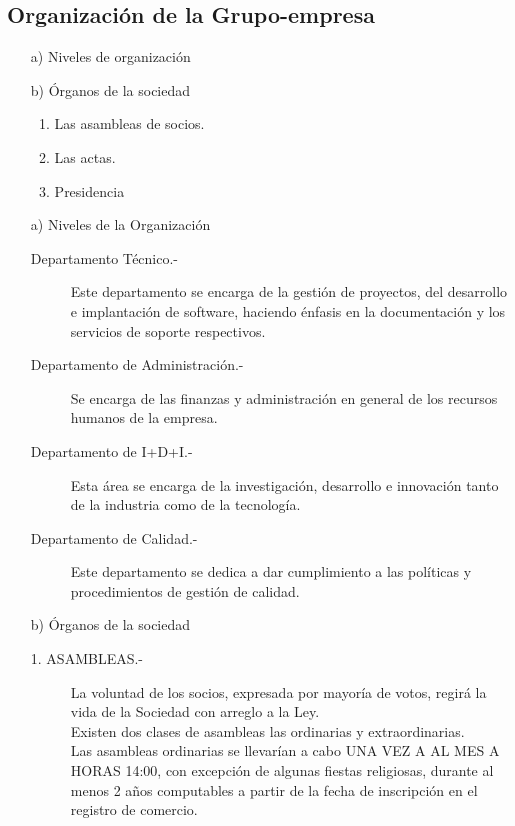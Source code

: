 \documentclass[11pt,letterpaper]{report}
\begin{document}
\subsection{ Organizaci\'on de la Grupo-empresa }
\begin{itemize}
\item[a)] Niveles de organizaci\'on
\item[b)] \'Organos de la sociedad
\begin{enumerate}
\item Las asambleas de socios.
\item Las actas.
\item Presidencia
\end{enumerate}

\end{itemize}

\begin{itemize}
\item[a)] Niveles de la Organizaci\'on
\begin{description}
\item[Departamento T\'ecnico.-]
Este departamento se encarga de la gesti\'on de proyectos, del desarrollo e implantaci\'on de software, haciendo \'enfasis en la documentaci\'on y los servicios de
soporte respectivos.
\item[Departamento de Administraci\'on.-] Se encarga de las finanzas y administraci\'on en general de los recursos humanos de la empresa.
\item[Departamento de I+D+I.-] Esta \'area se encarga de la investigaci\'on, desarrollo e innovaci\'on tanto de la industria como de la tecnolog\'ia.
\item[Departamento de Calidad.-] Este departamento se dedica a dar cumplimiento a las pol\'iticas y procedimientos de gesti\'on de calidad.
\end{description}
\item[b)] \'Organos de la sociedad
\begin{description}
\item[1. ASAMBLEAS.-] La voluntad de los socios, expresada por mayor\'ia de votos, regir\'a la vida de la Sociedad con arreglo a la Ley.\\
Existen dos clases de asambleas las ordinarias y extraordinarias.\\
Las asambleas ordinarias se llevar\'ian a cabo UNA VEZ A AL MES A HORAS 14:00, con excepci\'on de algunas fiestas religiosas, durante al menos 2 a\~nos computables a partir de la fecha de inscripci\'on en el registro de comercio.\\

\end{description}
\end{itemize}
\end{document}

